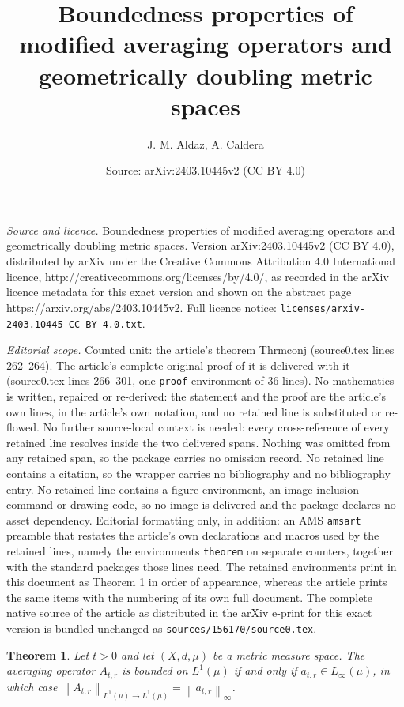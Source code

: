 \documentclass[10pt,a4paper]{amsart}
\title{Boundedness properties of modified averaging operators and geometrically doubling metric spaces}
\author{J. M. Aldaz, A. Caldera}
\date{Source: arXiv:2403.10445v2 (CC BY 4.0)}
\newtheorem{theorem}{Theorem}
\begin{document}
\maketitle

\noindent\emph{Source and licence.} Boundedness properties of modified averaging operators and geometrically doubling metric spaces. Version arXiv:2403.10445v2 (CC BY 4.0), distributed by arXiv under the Creative Commons Attribution 4.0 International licence, http://creativecommons.org/licenses/by/4.0/, as recorded in the arXiv licence metadata for this exact version and shown on the abstract page https://arxiv.org/abs/2403.10445v2. Full licence notice: \texttt{licenses/arxiv-2403.10445-CC-BY-4.0.txt}.\par\smallskip

\noindent\textit{Editorial scope.} Counted unit: the article's theorem Thrmconj (source0.tex lines 262--264). The article's complete original proof of it is delivered with it (source0.tex lines 266--301, one \texttt{proof} environment of 36 lines). No mathematics is written, repaired or re-derived: the statement and the proof are the article's own lines, in the article's own notation, and no retained line is substituted or re-flowed.  No further source-local context is needed: every cross-reference of every retained line resolves inside the two delivered spans.  Nothing was omitted from any retained span, so the package carries no omission record.  No retained line contains a citation, so the wrapper carries no bibliography and no bibliography entry.  No retained line contains a figure environment, an image-inclusion command or drawing code, so no image is delivered and the package declares no asset dependency.  Editorial formatting only, in addition: an AMS \texttt{amsart} preamble that restates the article's own declarations and macros used by the retained lines, namely the environments \texttt{theorem} on separate counters, together with the standard packages those lines need.  The retained environments print in this document as Theorem 1 in order of appearance, whereas the article prints the same items with the numbering of its own full document.  The complete native source of the article as distributed in the arXiv e-print for this exact version is bundled unchanged as \texttt{sources/156170/source0.tex}.
\begin{theorem}\label{Thrmconj} 
	Let $t > 0$ and let $(X,d,\mu)$ be a metric measure space. The averaging operator $A_{t,r}$ is bounded on $L^1(\mu)$ if and only if $a_{t,r} \in L_{\infty}(\mu)$, in which case $\left \|  A_{t,r}\right \|_{L^1(\mu) \rightarrow L^1(\mu)} = \left \| a_{t,r} \right \|_{\infty}$.
\end{theorem}
\end{document}
